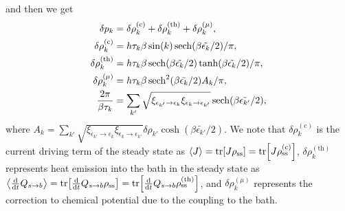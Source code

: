 \documentclass[a4paper, amsfonts, amssymb, amsmath, reprint, showkeys, nofootinbib, twoside,superscriptaddress, prl]{revtex4-2}
\newcommand{\mr}[1]{\mathrm{#1}}
\newcommand{\sk}{\sin(k)}
\newcommand{\epk}{\epsilon_k}
\newcommand{\epkp}{\epsilon_{k'}}
\newcommand{\dt}{\frac{\mathrm{d}}{\mathrm{d}t}}
\begin{document}
and then we get
\begin{align}
    \delta p_k &= \delta\rho^{(\mr{c})}_k + \delta\rho^{(\mr{th})}_k + \delta\rho^{(\mu)}_k,\label{results}\\%
    \delta\rho^{(\mr{c})}_k&=h \tau_k \beta\sk\sech(\beta\tilde{\epk}/2)/\pi,\label{current_term}\\
    \delta\rho^{(\mr{th})}_k&=h \tau_k\beta\sech(\beta\tilde{\epk}/2)\tanh(\beta\tilde{\epk}/2)/\pi,\label{thermal_term}\\
    \delta\rho^{(\mu)}_k&=h \tau_k \beta\sech^2(\beta\tilde{\epk}/2)A_k/\pi,\label{chemical_potential_term}\\
    \frac{2\pi}{\beta\tau_k} &= \sum_{k'}\sqrt{\xi_{\epkp\rightarrow\epk}\xi_{\epk\rightarrow\epkp}}\sech(\beta\tilde{\epkp}/2),\label{relaxation_time}
\end{align}
where $A_k = \sum_{k'}\sqrt{\xi_{\epkp\rightarrow\epk}\xi_{\epk\rightarrow\epkp}}\delta\rho_{k'}\cosh(\beta\tilde{\epkp}/2)$.
We note that $\delta\rho_k^{(\mr{c})}$ is the current driving term of the steady state as $\ev{J} = \tr[J\rho_{\mr{ss}}] = \tr[J\rho^{(\mr{c})}_{\mr{ss}}]$, $\delta\rho_k^{(\mr{th})}$ represents heat emission into the bath in the steady state as $\ev{\dt Q_{s\rightarrow b}} = \tr[\dt Q_{s\rightarrow b}\rho_{\mr{ss}}] = \tr[\dt Q_{s\rightarrow b}\rho^{(\mr{th})}_{\mr{ss}}]$, and $\delta\rho_k^{(\mu)}$ represents the correction to chemical potential due to the coupling to the bath. 
\end{document}
